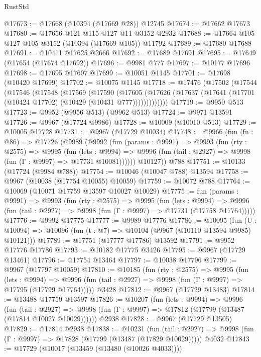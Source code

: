 \begin{lexlean}{RustStd}
\begin{coremodule}
{\begin{coremodule}
{{{{{{{{{{{{{{{{{{{{{{{{{{{{{{{{{{{{{{{{{{{{{{{{{{{{{{{{{{{{{{{{{{{{{{{{{{{{{{@17673 := @17668 (@10394 (@17669 @28)) @12745
@17674 := @17662 @17673
@17680 := @17656 @121 @115 @127 @11 @3152 @2932
@17688 := @17664 @105 @127 @105 @3152 (@10394 (@17669 @105)) @11792
@17689 := @17680 @17688
@17691 := @10411 @17625 @2666
@17692 := @17689 @17691
@17695 := @17649 (@17654 (@17674 @17692))
@17696 := @9981 @777
@17697 := @10177 @17696
@17698 := @17695 @17697
@17699 := @10051 @1145
@17701 := @17698 (@10420 @17699)
@17702 := @10075 @1145
@17718 := @17476
    (@17502
      (@17544
        (@17546
          (@17548
            (@17569
              (@17590
                (@17605
                  (@17626 (@17637 (@17641 (@17701 (@10424 @17702) (@10429 (@10431 @777)))))))))))))
@17719 := @9950 @513
@17723 := @9952 (@9956 @513) (@9962 @513)
@17724 := @9971 @13591
@17726 := @9967 (@17724 @9986)
@17728 := @10009 (@10010 @513)
@17729 := @10005 @17728
@17731 := @9967 (@17729 @10034)
@17748 := @9966
    (fun (fn : @86) =>
    @17726
      (@9989
        (@9992
          (fun (params : @9991) =>
          @9993
            (fun (rty : @2575) =>
            @9995
              (fun (lets : @9994) =>
              @9996 (fun (tail : @2927) => @9998 (fun (Γ : @9997) => @17731 @10081))))))
        @10127))
    @788
@17751 := @10133 (@17724 (@9984 @788))
@17754 := @10046 (@10047 @788) @13594
@17758 := @9967 (@10038 (@17754 @10055) @10059)
@17759 := @10072 @788
@17764 := @10069 (@10071 @17759 @13597 @10027 @10029)
@17775 := fun (params : @9991) =>
  @9993
    (fun (rty : @2575) =>
    @9995
      (fun (lets : @9994) =>
      @9996 (fun (tail : @2927) => @9998 (fun (Γ : @9997) => @17731 (@17758 @17764)))))
@17776 := @9992 @17775
@17777 := @9989 @17776
@17786 := @10095
    (fun (U : @10094) => @10096 (fun (t : @7) => @10104 (@9967 (@10110 @13594 @9985) @10121)))
@17789 := @17751 (@17777 @17786) @13592
@17791 := @9952 @17776 @17786
@17793 := @10182 @17775 @3426
@17795 := @9967 (@17729 @13461)
@17796 := @17754 @13464
@17797 := @10038 @17796
@17799 := @9967 (@17797 @10059)
@17810 := @10185
    (fun (rty : @2575) =>
    @9995
      (fun (lets : @9994) =>
      @9996 (fun (tail : @2927) => @9998 (fun (Γ : @9997) => @17795 (@17799 @17764)))))
    @3428
@17812 := @9967 (@17729 @13483)
@17814 := @13488 @17759 @13597
@17826 := @10207
    (fun (lets : @9994) =>
    @9996
      (fun (tail : @2927) =>
      @9998 (fun (Γ : @9997) => @17812 (@17799 (@13487 (@17814 @10027 @10029))))))
    @2938
@17828 := @9967 (@17729 @13505)
@17829 := @17814 @2938
@17838 := @10231
    (fun (tail : @2927) => @9998 (fun (Γ : @9997) => @17828 (@17799 (@13487 (@17829 @10029)))))
    @4032
@17843 := @17729 (@10017 (@13459 (@13480 (@10026 @4033))))
}}}}}}}}}}}}}}}}}}}}}}}}}}}}}}}}}}}}}}}}}}}}}}}}}}}}}}}}}}}}}}}}}}}}}}}}}}}}}}
\end{coremodule}}
\end{coremodule}
\end{lexlean}
